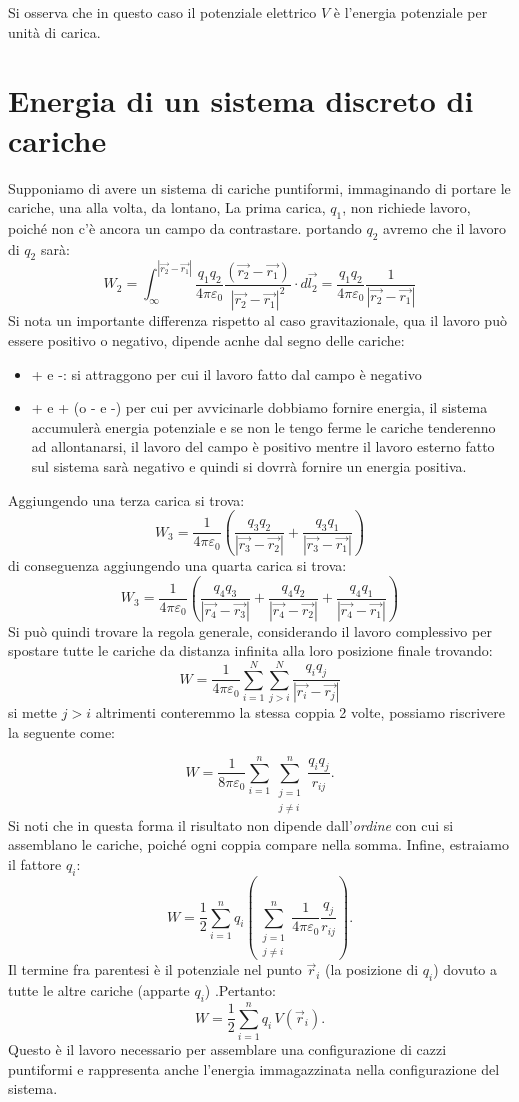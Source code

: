 \documentclass{book}
\begin{document}
Si osserva che in questo caso il potenziale elettrico \(V\) è l'energia potenziale per unità di carica.

\section{Energia di un sistema discreto di cariche}
Supponiamo di avere un sistema di cariche puntiformi, 
immaginando di portare le cariche, una alla volta, da lontano, La prima carica, $q_1$, non richiede lavoro, poiché non c'è ancora un campo da contrastare. portando $q_2$ avremo che il lavoro di $q_2$ sarà: 
$$
W_2 = \int_{\infty}^{|\vec{r_2}-\vec{r_1}|} \frac{q_1q_2}{4\pi   \varepsilon_0} \frac{(\vec{r_2}-\vec{r_1})}{|\vec{r_2}-\vec{r_1}|^2} \cdot d\vec{l_2}
= \frac{q_1q_2}{4\pi   \varepsilon_0} \frac{1}{|\vec{r_2}-\vec{r_1}|}
$$
Si nota un importante differenza rispetto al caso gravitazionale, qua il lavoro può essere positivo  o negativo, dipende acnhe dal segno delle cariche:

\begin{itemize}
    \item + e -: si attraggono per cui il lavoro fatto dal campo è negativo 
    \item + e + (o - e -) per cui per avvicinarle dobbiamo fornire energia, il sistema accumulerà energia potenziale e se non le tengo ferme le cariche tenderenno ad allontanarsi, il lavoro del campo è positivo mentre il lavoro esterno fatto sul sistema sarà negativo e quindi si dovrrà fornire un energia positiva.
\end{itemize}
Aggiungendo una terza carica si trova: 
$$
W_3=  \frac{1}{4\pi   \varepsilon_0} \left( \frac{q_3 q_2}{|\vec{r_3}-\vec{r_2}|} + \frac{q_3 q_1}{|\vec{r_3}-\vec{r_1}|} \right)
$$
di conseguenza aggiungendo una quarta carica si trova: 
$$
W_3=  \frac{1}{4\pi   \varepsilon_0} \left( \frac{q_4 q_3}{|\vec{r_4}-\vec{r_3}|} + \frac{q_4 q_2}{|\vec{r_4}-\vec{r_2}|} + \frac{q_4 q_1}{|\vec{r_4}-\vec{r_1}|}  \right)
$$
Si può quindi trovare la regola generale, considerando il lavoro complessivo per spostare tutte le cariche da distanza infinita alla loro posizione finale trovando:
$$
W= \frac{1}{4\pi   \varepsilon_0} \sum_{i=1}^{N} \sum_{j>i}^{N}\frac{q_i q_j}{|\vec{r_i}-\vec{r_j}|}
$$
si mette $j > i$ altrimenti conteremmo la stessa coppia 2 volte, possiamo riscrivere la seguente come:

\[
W = \frac{1}{8\pi\varepsilon_0}\sum_{i=1}^n\sum_{\substack{j=1\\ j\neq i}}^n \frac{q_i q_j}{r_{ij}}.
\]
 Si noti che in questa forma il risultato non dipende dall'\emph{ordine} con cui si assemblano le cariche, poiché ogni coppia compare nella somma.
 Infine, estraiamo il fattore \(q_i\):
\[
W = \frac{1}{2}\sum_{i=1}^n q_i\!\left(\sum_{\substack{j=1\\ j\neq i}}^n \frac{1}{4\pi\varepsilon_0}\frac{q_j}{r_{ij}}\right).
\]
 Il termine fra parentesi è il potenziale nel punto \(\vec{r}_i\) (la posizione di \(q_i\)) dovuto a tutte le altre cariche (apparte $q_i$) .Pertanto:
\[
W = \frac{1}{2}\sum_{i=1}^n q_i\,V(\vec{r}_i).
\]
Questo è il lavoro  necessario per assemblare una configurazione di cazzi puntiformi e rappresenta anche l'energia immagazzinata nella configurazione del sistema.
\end{document}
